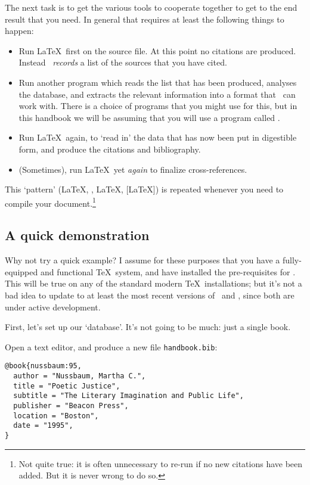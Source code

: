 The next task is to get the various tools to cooperate together to get
to the end result that you need. In general that requires at least the
following things to happen:
\begin{itemize}
\item Run \LaTeX\ first on the source file. At this point no citations
  are produced. Instead \biblatex\ \emph{records} a list of the
  sources that you have cited.
\item Run another program which reads the list that has been produced,
  analyses the database, and extracts the relevant information into a
  format that \biblatex\ can work with. There is a choice of programs
  that you might use for this, but in this handbook we will be
  assuming that you will use a program called .
\item Run \LaTeX\ again, to `read in' the data that has now been put
  in digestible form, and produce the citations and bibliography.
\item (Sometimes), run \LaTeX\ yet \emph{again} to finalize cross-references.
\end{itemize}

This `pattern' (\LaTeX, , \LaTeX, [\LaTeX]) is repeated
whenever you need to compile your document.\footnote{Not quite true:
  it is often unnecessary to re-run  if no new
  citations have been added. But it is never wrong to do so.}

\subsection{A quick demonstration\label{neophyte:example}}

Why not try a quick example? I assume for these purposes that you have
a fully-equipped and functional \TeX\ system, and have installed the
pre-requisites for \biblatex. This will be true on any of the standard
modern \TeX\ installations; but it's not a bad idea to update to at
least the most recent versions of \biblatex\ and ,
since both are under active development.

First, let's set up our `database'. It's not going to be much: just a
single book.

Open a text editor, and produce a new file
\texttt{handbook.bib}:

\begin{verbatim}
@book{nussbaum:95,
  author = "Nussbaum, Martha C.",
  title = "Poetic Justice",
  subtitle = "The Literary Imagination and Public Life",
  publisher = "Beacon Press",
  location = "Boston",
  date = "1995",
}
\end{verbatim}

